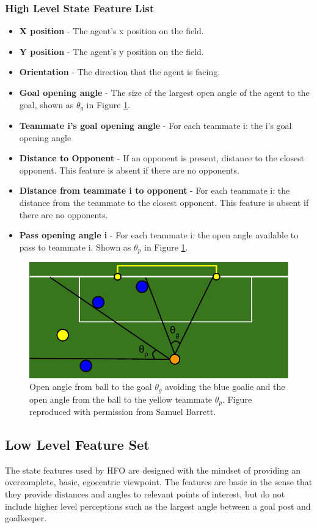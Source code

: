 \documentclass[12pt]{article}
\begin{document}
\subsubsection{High Level State Feature List}
\begin{itemize}
\item{\textbf{X position} - The agent’s x position on the field.}
\item{\textbf{Y position} - The agent’s y position on the field.}
\item{\textbf{Orientation} - The direction that the agent is facing.}
\item{\textbf{Goal opening angle} - The size of the largest open angle
  of the agent to the goal, shown as $\theta_g$ in Figure
  \ref{fig:openAngle}.}
\item{\textbf{Teammate i's goal opening angle} - For each teammate i:
  the i’s goal opening angle}
\item{\textbf{Distance to Opponent} - If an opponent is present,
  distance to the closest opponent. This feature is absent if there
  are no opponents.}
\item{\textbf{Distance from teammate i to opponent} - For each teammate
  i: the distance from the teammate to the closest opponent. This
  feature is absent if there are no opponents.}
\item{\textbf{Pass opening angle i} - For each teammate i: the open
  angle available to pass to teammate i. Shown as $\theta_p$ in Figure
  \ref{fig:openAngle}.}
\end{itemize}

\begin{figure}[htp]
  \centering
  \includegraphics[width=.75\textwidth]{figures/openAngle}
  \caption{Open angle from ball to the goal $\theta_g$ avoiding the
    blue goalie and the open angle from the ball to the yellow
    teammate $\theta_p$. Figure reproduced with permission from Samuel
    Barrett.}
  \label{fig:openAngle}
\end{figure}

\subsection {Low Level Feature Set}
The state features used by HFO are designed with the mindset of
providing an overcomplete, basic, egocentric viewpoint. The features
are basic in the sense that they provide distances and angles to
relevant points of interest, but do not include higher level
perceptions such as the largest angle between a goal post and
goalkeeper.
\end{document}
